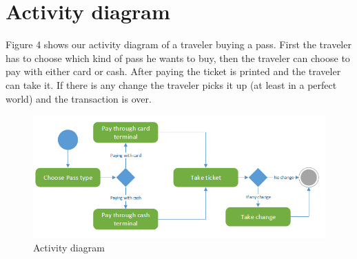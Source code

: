 \documentclass[pdftex,12pt,a4paper]{article}
\begin{document}
\pagebreak

\section{Activity diagram}
Figure 4 shows our activity diagram of a traveler buying a pass. First the traveler has to choose which kind of pass he wants to buy, then the traveler can choose to pay with either card or cash. After paying the ticket is printed and the traveler can take it. If there is any change the traveler picks it up (at least in a perfect world) and the transaction is over.
\begin{figure}[h]
\centering
\includegraphics[scale = 0.8]{activity.png}
\caption{Activity diagram}
\end{figure}
\end{document}
